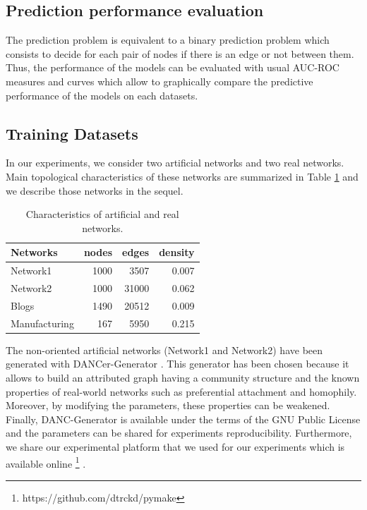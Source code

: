 \subsection{Prediction performance evaluation}
The prediction problem is equivalent to a binary prediction problem which consists to decide for each pair of nodes if there is an edge or not between them. 
Thus, the performance of the models can be evaluated with usual AUC-ROC measures and curves which allow to graphically compare the predictive performance of the models on each datasets.

\subsection{Training Datasets}

In our experiments, we consider two artificial networks and two real networks.  Main topological characteristics of these networks are summarized in Table \ref{table:networks_measures} and we describe those networks in the sequel.

\begin{table}[h] 
	\centering
	\caption{Characteristics of artificial and real networks.}
    \begin{tabular}{lrrr}
        \hline
        \textbf{Networks} &   nodes &   edges &   density \\
        \hline
        Network1 &    1000 &    3507 &     0.007 \\
        Network2 &    1000 &   31000 &     0.062 \\
        Blogs         &    1490 &   20512 &     0.009 \\
        Manufacturing &     167 &    5950 &     0.215 \\
    \hline
    \end{tabular}
	\label{table:networks_measures}
\end{table}

The non-oriented artificial networks (Network1 and Network2) have been generated with DANCer-Generator \cite{largeron2015}. This generator has been chosen because it allows to build an attributed graph having a community structure  and  the known properties of real-world networks such as preferential attachment and homophily.
Moreover, by modifying the parameters, these properties can be weakened. Finally, DANC-Generator is available under the terms of the GNU Public License and the parameters can be shared for experiments reproducibility. Furthermore, we share our experimental platform that we used for our experiments which is available online  \footnote{https://github.com/dtrckd/pymake} .


